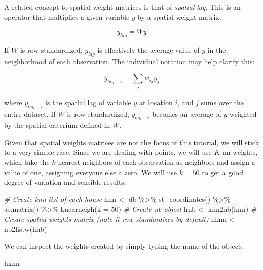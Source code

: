 \documentclass[
]{book}
\newenvironment{Shaded}{\begin{snugshade}}{\end{snugshade}}
\newcommand{\AttributeTok}[1]{\textcolor[rgb]{0.77,0.63,0.00}{#1}}
\newcommand{\CommentTok}[1]{\textcolor[rgb]{0.56,0.35,0.01}{\textit{#1}}}
\newcommand{\DecValTok}[1]{\textcolor[rgb]{0.00,0.00,0.81}{#1}}
\newcommand{\FunctionTok}[1]{\textcolor[rgb]{0.00,0.00,0.00}{#1}}
\newcommand{\NormalTok}[1]{#1}
\newcommand{\OtherTok}[1]{\textcolor[rgb]{0.56,0.35,0.01}{#1}}
\newcommand{\SpecialCharTok}[1]{\textcolor[rgb]{0.00,0.00,0.00}{#1}}
\begin{document}
A related concept to spatial weight matrices is that of \emph{spatial lag}. This is an operator that multiplies a given variable \(y\) by a spatial weight matrix:

\[
y_{lag} = W y
\]

If \(W\) is row-standardized, \(y_{lag}\) is effectively the average value of \(y\) in the neighborhood of each observation. The individual notation may help clarify this:

\[
y_{lag-i} = \displaystyle \sum_j w_{ij} y_j
\]

where \(y_{lag-i}\) is the spatial lag of variable \(y\) at location \(i\), and \(j\) sums over the entire dataset. If \(W\) is row-standardized, \(y_{lag-i}\) becomes an average of \(y\) weighted by the spatial criterium defined in \(W\).

Given that spatial weights matrices are not the focus of this tutorial, we will stick to a very simple case. Since we are dealing with points, we will use \(K\)-nn weights, which take the \(k\) nearest neighbors of each observation as neighbors and assign a value of one, assigning everyone else a zero. We will use \(k=50\) to get a good degree of variation and sensible results.

\begin{Shaded}
\begin{Highlighting}[]
\CommentTok{\# Create knn list of each house}
\NormalTok{hnn }\OtherTok{\textless{}{-}}\NormalTok{ db }\SpecialCharTok{\%\textgreater{}\%}
  \FunctionTok{st\_coordinates}\NormalTok{() }\SpecialCharTok{\%\textgreater{}\%}
  \FunctionTok{as.matrix}\NormalTok{() }\SpecialCharTok{\%\textgreater{}\%}
  \FunctionTok{knearneigh}\NormalTok{(}\AttributeTok{k =} \DecValTok{50}\NormalTok{)}
\CommentTok{\# Create nb object}
\NormalTok{hnb }\OtherTok{\textless{}{-}} \FunctionTok{knn2nb}\NormalTok{(hnn)}
\CommentTok{\# Create spatial weights matrix (note it row{-}standardizes by default)}
\NormalTok{hknn }\OtherTok{\textless{}{-}} \FunctionTok{nb2listw}\NormalTok{(hnb)}
\end{Highlighting}
\end{Shaded}

We can inspect the weights created by simply typing the name of the object:

\begin{Shaded}
\begin{Highlighting}[]
\NormalTok{hknn}
\end{Highlighting}
\end{Shaded}
\end{document}
